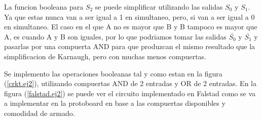 \documentclass[]{informeutn}
\begin{document}
    La funcion booleana para $S_2$ se puede simplificar utilizando las salidas $S_0$ y $S_1$. Ya que estas nunca van
    a ser igual a 1 en simultaneo, pero, si van a ser igual a 0 en simultaneo. El caso en el que A no es mayor que B y
    B tampoco es mayor que A, es cuando A y B son iguales, por lo que podriamos tomar las salidas $\overline{S_0}$ y
    $\overline{S_1}$ y pasarlas por una compuerta AND para que produzcan el mismo resultado que la simplificacion de
    Karnaugh, pero con muchas menos compuertas.

    Se implemento las operaciones booleanas tal y como estan en la figura (\ref{crkt.ej2}), utilizando compuertas AND
    de 2 entradas y OR de 2 entradas. En la figura (\ref{falstad.ej2}) se puede ver el circuito implementado en Falstad
    como se va a implementar en la protoboard en base a las compuertas disponibles y comodidad de armado.
\end{document}
